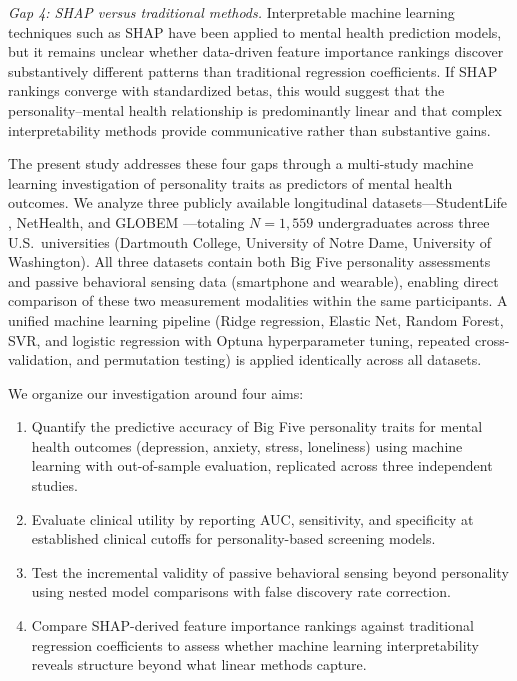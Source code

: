 \documentclass[12pt, a4paper]{article}
\begin{document}
\textit{Gap 4: SHAP versus traditional methods.} Interpretable machine learning techniques such as SHAP \citep{lundberg2017unified} have been applied to mental health prediction models, but it remains unclear whether data-driven feature importance rankings discover substantively different patterns than traditional regression coefficients. If SHAP rankings converge with standardized betas, this would suggest that the personality--mental health relationship is predominantly linear and that complex interpretability methods provide communicative rather than substantive gains.

The present study addresses these four gaps through a multi-study machine learning investigation of personality traits as predictors of mental health outcomes. We analyze three publicly available longitudinal datasets---StudentLife \citep{wang2014studentlife}, NetHealth, and GLOBEM \citep{xu2022globem}---totaling $N = 1{,}559$ undergraduates across three U.S.\ universities (Dartmouth College, University of Notre Dame, University of Washington). All three datasets contain both Big Five personality assessments and passive behavioral sensing data (smartphone and wearable), enabling direct comparison of these two measurement modalities within the same participants. A unified machine learning pipeline (Ridge regression, Elastic Net, Random Forest, SVR, and logistic regression with Optuna hyperparameter tuning, repeated cross-validation, and permutation testing) is applied identically across all datasets.

We organize our investigation around four aims:

\begin{enumerate}
    \item[\textbf{Aim 1.}] Quantify the predictive accuracy of Big Five personality traits for mental health outcomes (depression, anxiety, stress, loneliness) using machine learning with out-of-sample evaluation, replicated across three independent studies.
    \item[\textbf{Aim 2.}] Evaluate clinical utility by reporting AUC, sensitivity, and specificity at established clinical cutoffs for personality-based screening models.
    \item[\textbf{Aim 3.}] Test the incremental validity of passive behavioral sensing beyond personality using nested model comparisons with false discovery rate correction.
    \item[\textbf{Aim 4.}] Compare SHAP-derived feature importance rankings against traditional regression coefficients to assess whether machine learning interpretability reveals structure beyond what linear methods capture.
\end{enumerate}
\end{document}
